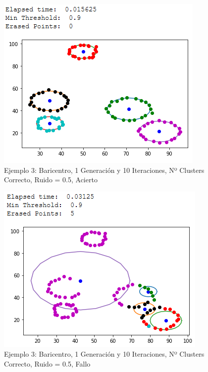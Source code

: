\documentclass[conference,a4paper]{IEEEtran}
\begin{document}
\begin{figure}[H]
\centering
\includegraphics[scale=0.65]{Experimentacion/Ejemplo3/ej3_b_1_10_lr_correct}
\caption{Ejemplo 3: Baricentro, 1 Generación y 10 Iteraciones,  Nº Clusters Correcto, Ruido = 0.5, Acierto\\}
\end{figure}

\begin{figure}[H]
\centering
\includegraphics[scale=0.65]{Experimentacion/Ejemplo3/ej3_b_1_10_lr_wrong}
\caption{Ejemplo 3: Baricentro, 1 Generación y 10 Iteraciones,  Nº Clusters Correcto, Ruido = 0.5, Fallo\\}
\end{figure}
\end{document}
